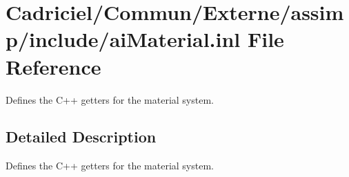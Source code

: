 \hypertarget{ai_material_8inl}{\section{Cadriciel/\-Commun/\-Externe/assimp/include/ai\-Material.inl File Reference}
\label{ai_material_8inl}
}


Defines the C++ getters for the material system.  




\subsection{Detailed Description}
Defines the C++ getters for the material system. 
